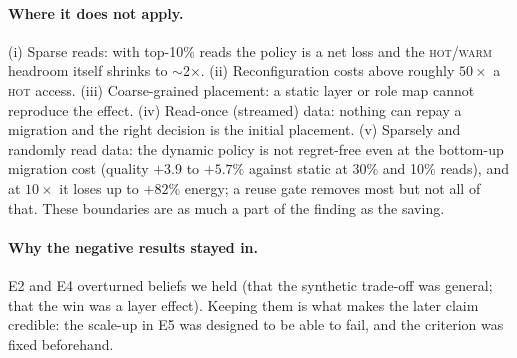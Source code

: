 \documentclass[10pt,a4paper]{article}
\newcommand{\hot}{\textsc{hot}}
\newcommand{\warm}{\textsc{warm}}
\begin{document}
\paragraph{Where it does not apply.} (i) Sparse reads: with top-10\% reads the policy is a net loss and the \hot{}/\warm{} headroom itself shrinks to $\sim$2$\times$. (ii) Reconfiguration costs above roughly $50\times$ a \hot{} access. (iii) Coarse-grained placement: a static layer or role map cannot reproduce the effect. (iv) Read-once (streamed) data: nothing can repay a migration and the right decision is the initial placement. (v) Sparsely and randomly read data: the dynamic policy is not regret-free even at the bottom-up migration cost (quality $+3.9$ to $+5.7\%$ against static at 30\% and 10\% reads), and at $10\times$ it loses up to $+82\%$ energy; a reuse gate removes most but not all of that. These boundaries are as much a part of the finding as the saving.

\paragraph{Why the negative results stayed in.} E2 and E4 overturned beliefs we held (that the synthetic trade-off was general; that the win was a layer effect). Keeping them is what makes the later claim credible: the scale-up in E5 was designed to be able to fail, and the criterion was fixed beforehand.
\end{document}

